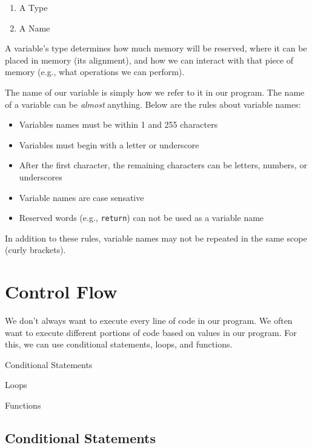 \documentclass[11pt,fancy,authoryear]{elegantbook}
\begin{document}
\begin{enumerate}
  \item A Type
  \item A Name
\end{enumerate}

A variable's type determines how much memory will be reserved, where it can be placed in memory (its alignment), and how we can interact with that piece of memory (e.g., what operations we can perform).

The name of our variable is simply how we refer to it in our program. The name of a variable can be \textit{almost} anything. Below are the rules about variable names:

\begin{itemize}
  \item Variables names must be within 1 and 255 characters
  \item Variables must begin with a letter or underscore
  \item After the first character, the remaining characters can be letters, numbers, or underscores
  \item Variable names are case sensative
  \item Reserved words (e.g., \lstinline{return}) can not be used as a variable name
\end{itemize}

In addition to these rules, variable names may not be repeated in the same scope (curly brackets).

\chapter{Control Flow}

We don't always want to execute every line of code in our program. We often want to execute different portions of code based on values in our program. For this, we can use conditional statements, loops, and functions.

\begin{introduction}
  \item Conditional Statements
  \item Loops
  \item Functions
\end{introduction}

\section{Conditional Statements}
\end{document}
